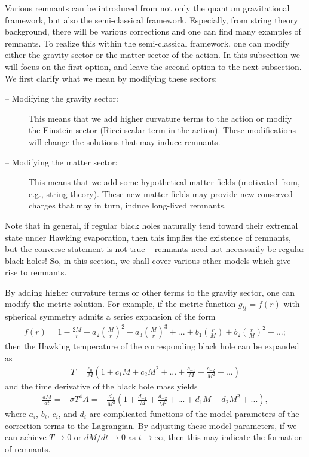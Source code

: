 \documentclass[12pt]{article}
\newcommand{\2}{$^2$}
\newcommand{\3}{$^3$}
\newcommand{\4}{$_4$}
\newcommand{\5}{$_5$}
\begin{document}
Various remnants can be introduced from not only the quantum gravitational framework, but also the semi-classical framework. Especially, from string theory background, there will be various corrections and one can find many examples of remnants. To realize this within the semi-classical framework, one can modify either the gravity sector or the matter sector of the action. In this subsection we will focus on the first option, and leave the second option to the next subsection. We first clarify what we mean by modifying these sectors:
\begin{description}
\item[-- Modifying the gravity sector:] This means that we add higher curvature terms to the action or modify the Einstein sector (Ricci scalar term in the action). These modifications will change the solutions that may induce remnants.
\item[-- Modifying the matter sector:] This means that we add some hypothetical matter fields (motivated from, e.g., string theory). These new matter fields may provide new conserved charges that may in turn, induce long-lived remnants.
\end{description}
Note that in general, if regular black holes naturally tend toward their extremal state under Hawking evaporation, then this implies the existence of remnants, but the converse statement is not true -- remnants need not necessarily be regular black holes! So, in this section, we shall cover various other models which give rise to remnants.

By adding higher curvature terms or other terms to the gravity sector, one can modify the metric solution. For example, if the metric function $g_{tt}=f(r)$ with spherical symmetry admits a series expansion of the form
\begin{eqnarray}
f(r) = 1 - \frac{2M}{r} + a_{2} \left( \frac{M}{r} \right)^{2} + a_{3} \left( \frac{M}{r} \right)^{3} + ... + b_{1}\left( \frac{r}{M} \right)+ b_{2} \left( \frac{r}{M} \right)^{2} + ...;
\end{eqnarray}
then the Hawking temperature of the corresponding black hole can be expanded as
\begin{eqnarray}
T = \frac{c_{0}}{M} \left( 1 + c_{1} M + c_{2} M^{2} + ... + \frac{c_{-1}}{M} + \frac{c_{-2}}{M^{2}} + ... \right)
\end{eqnarray}
and the time derivative of the black hole mass yields \cite{Barrow:1992hq}
\begin{eqnarray}
\frac{dM}{dt} = -\sigma T^{4} A = -\frac{d_{0}}{M^{2}} \left( 1 + \frac{d_{-1}}{M} + \frac{d_{-2}}{M^{2}} + ... + d_{1} M + d_{2} M^{2} + ... \right),
\end{eqnarray}
where $a_{i}$, $b_{i}$, $c_{i}$, and $d_{i}$ are complicated functions of the model parameters of the correction terms to the Lagrangian. By adjusting these model parameters, if we can achieve $T \rightarrow 0$ or $dM/dt \rightarrow 0$ as $t \to \infty$, then this may indicate the formation of remnants.
\end{document}
